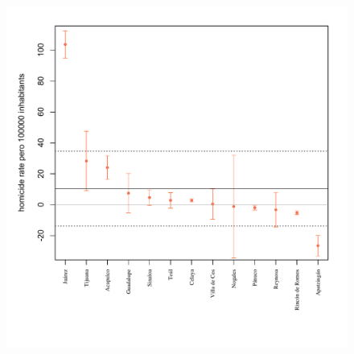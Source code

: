 \documentclass{article}[11 pt]
\begin{document}
\begin{figure}[htdp]
	\centering
  \includegraphics[scale=0.5]{Images/results.pdf}
\end{figure}
\end{document}
